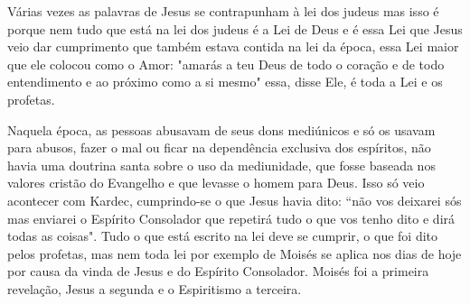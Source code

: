 Várias vezes as palavras de Jesus se contrapunham à lei dos judeus mas isso é porque nem tudo que está na lei dos judeus é a Lei de Deus e é essa Lei que Jesus veio dar cumprimento que também estava contida na lei da época, essa Lei maior que ele colocou como o Amor: "amarás a teu Deus de todo o coração e de todo entendimento e ao próximo como a si mesmo" essa, disse Ele, é toda a Lei e os profetas. 

Naquela época, as pessoas abusavam de seus dons mediúnicos e só os usavam para abusos, fazer o mal ou ficar na dependência exclusiva dos espíritos, não havia uma doutrina santa sobre o uso da mediunidade, que fosse baseada nos valores cristão do Evangelho e que levasse o homem para Deus. Isso só veio acontecer com Kardec, cumprindo-se o que Jesus havia dito: ``não vos deixarei sós mas enviarei o Espírito Consolador que repetirá tudo o que vos tenho dito e dirá todas as coisas". Tudo o que está escrito na lei deve se cumprir, o que foi dito pelos profetas, mas nem toda lei por exemplo de Moisés se aplica nos dias de hoje por causa da vinda de Jesus e do Espírito Consolador. Moisés foi a primeira revelação, Jesus a segunda e o Espiritismo a terceira.